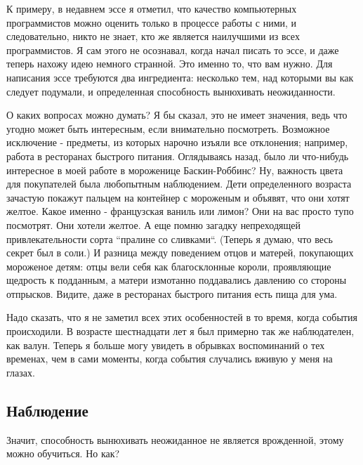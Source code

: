 \documentclass[ebook,12pt,oneside,openany]{memoir}
\begin{document}
К примеру, в недавнем эссе я отметил, что качество компьютерных
программистов можно оценить только в процессе работы с ними, и
следовательно, никто не знает, кто же является наилучшими из всех
программистов. Я сам этого не осознавал, когда начал писать то эссе, и
даже теперь нахожу идею немного странной. Это именно то, что вам
нужно. Для написания эссе требуются два ингредиента: несколько тем,
над которыми вы как следует подумали, и определенная способность
вынюхивать неожиданности. \newline

О каких вопросах можно думать? Я бы сказал, это не имеет значения,
ведь что угодно может быть интересным, если внимательно посмотреть.
Возможное исключение - предметы, из которых нарочно изъяли все
отклонения; например, работа в ресторанах быстрого питания.
Оглядываясь назад, было ли что-нибудь интересное в моей работе в
мороженице Баскин-Роббинс? Ну, важность цвета для покупателей была
любопытным наблюдением. Дети определенного возраста зачастую покажут
пальцем на контейнер с мороженым и объявят, что они хотят желтое.
Какое именно - французская ваниль или лимон? Они на вас просто тупо
посмотрят. Они хотели желтое. А еще помню загадку непреходящей
привлекательности сорта ``пралине со сливками``. (Теперь я думаю, что
весь секрет был в соли.) И разница между поведением отцов и матерей,
покупающих мороженое детям: отцы вели себя как благосклонные короли,
проявляющие щедрость к подданным, а матери измотанно поддавались
давлению со стороны отпрысков. Видите, даже в ресторанах быстрого
питания есть пища для ума. \newline

Надо сказать, что я не заметил всех этих особенностей в то время,
когда события происходили. В возрасте шестнадцати лет я был примерно
так же наблюдателен, как валун. Теперь я больше могу увидеть в
обрывках воспоминаний о тех временах, чем в сами моменты, когда
события случались вживую у меня на глазах. \newline

\subsection{Наблюдение}

Значит, способность вынюхивать неожиданное не является врожденной,
этому можно обучиться. Но как? \newline
\end{document}
